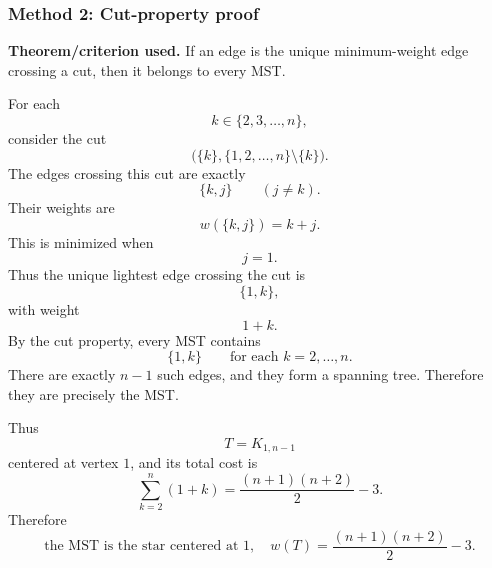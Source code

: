 \documentclass[12pt]{article}
\begin{document}
\subsubsection{Method 2: Cut-property proof}
\textbf{Theorem/criterion used.} If an edge is the unique minimum-weight edge crossing a cut, then it belongs to every MST.

For each
\[
  k\in\{2,3,\dots,n\},
\]
consider the cut
\[
  \bigl(\{k\},\{1,2,\dots,n\}\setminus\{k\}\bigr).
\]
The edges crossing this cut are exactly
\[
  \{k,j\}
  \qquad
  (j\neq k).
\]
Their weights are
\[
  w(\{k,j\})=k+j.
\]
This is minimized when
\[
  j=1.
\]
Thus the unique lightest edge crossing the cut is
\[
  \{1,k\},
\]
with weight
\[
  1+k.
\]
By the cut property, every MST contains
\[
  \{1,k\}
  \qquad
  \text{for each }k=2,\dots,n.
\]
There are exactly $n-1$ such edges, and they form a spanning tree. Therefore they are precisely the MST.

Thus
\[
  T=K_{1,n-1}
\]
centered at vertex $1$, and its total cost is
\[
  \sum_{k=2}^{n}(1+k)
  =
  \frac{(n+1)(n+2)}{2}-3.
\]
Therefore
\[
  \boxed{
  \text{the MST is the star centered at }1,\quad
  w(T)=\frac{(n+1)(n+2)}{2}-3.}
\]
\end{document}
